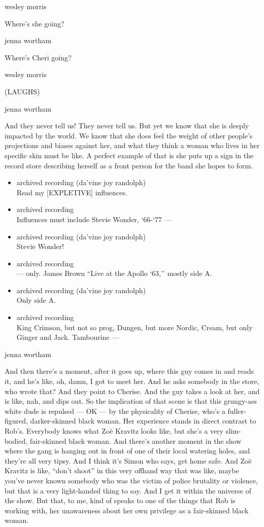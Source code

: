 wesley morris

Where's she going?

jenna wortham

Where's Cheri going?

wesley morris

(LAUGHS)

jenna wortham

And they never tell us! They never tell us. But yet we know that she is
deeply impacted by the world. We know that she does feel the weight of
other people's projections and biases against her, and what they think a
woman who lives in her specific skin must be like. A perfect example of
that is she puts up a sign in the record store describing herself as a
front person for the band she hopes to form.

\begin{itemize}
\item
  archived recording (da'vine joy randolph)\\
  Read my {[}EXPLETIVE{]} influences.
\item
  archived recording\\
  Influences must include Stevie Wonder, `66-`77 ---
\item
  archived recording (da'vine joy randolph)\\
  Stevie Wonder!
\item
  archived recording\\
  --- only. James Brown ``Live at the Apollo `63,'' mostly side A.
\item
  archived recording (da'vine joy randolph)\\
  Only side A.
\item
  archived recording\\
  King Crimson, but not so prog, Dungen, but more Nordic, Cream, but
  only Ginger and Jack. Tambourine ---
\end{itemize}

jenna wortham

And then there's a moment, after it goes up, where this guy comes in and
reads it, and he's like, oh, damn, I got to meet her. And he asks
somebody in the store, who wrote that? And they point to Cherise. And
the guy takes a look at her, and is like, nah, and dips out. So the
implication of that scene is that this grungy-ass white dude is repulsed
--- OK --- by the physicality of Cherise, who's a fuller-figured,
darker-skinned black woman. Her experience stands in direct contrast to
Rob's. Everybody knows what Zoë Kravitz looks like, but she's a very
slim-bodied, fair-skinned black woman. And there's another moment in the
show where the gang is hanging out in front of one of their local
watering holes, and they're all very tipsy. And I think it's Simon who
says, get home safe. And Zoë Kravitz is like, ``don't shoot'' in this
very offhand way that was like, maybe you've never known somebody who
was the victim of police brutality or violence, but that is a very
light-handed thing to say. And I get it within the universe of the show.
But that, to me, kind of speaks to one of the things that Rob is working
with, her unawareness about her own privilege as a fair-skinned black
woman.

